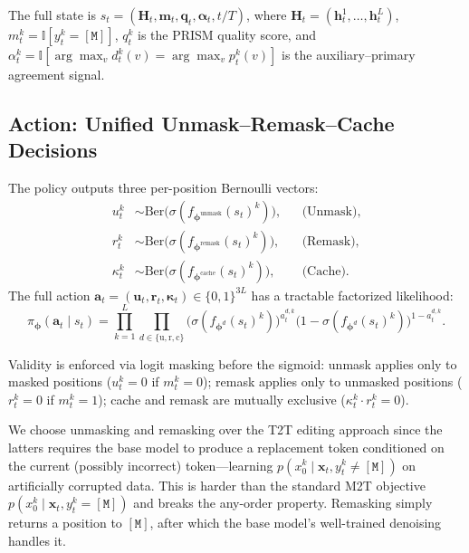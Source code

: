 \documentclass[11pt]{article}
\newcommand{\bphi}{\bm{\phi}}
\newcommand{\bx}{\mathbf{x}}
\newcommand{\bu}{\mathbf{u}}
\newcommand{\bh}{\mathbf{h}}
\newcommand{\bH}{\mathbf{H}}
\newcommand{\bfm}{\mathbf{m}}
\newcommand{\ind}{\mathbb{I}}
\newcommand{\mask}{\ensuremath{\mathtt{[M]}}}
\begin{document}
The full state is $s_t = (\bH_t, \bfm_t, \mathbf{q}_t, \bm{\alpha}_t, t/T)$, where $\bH_t = (\bh_t^1, \dots, \bh_t^L)$, $m_t^k = \ind[y_t^k = \mask]$, $q_t^k$ is the PRISM quality score, and $\alpha_t^k = \ind[\arg\max_v d_t^k(v) = \arg\max_v p_t^k(v)]$ is the auxiliary--primary agreement signal.

\subsection{Action: Unified Unmask--Remask--Cache Decisions}
\label{sec:action}

The policy outputs three per-position Bernoulli vectors:
\begin{align}
    u_t^k &\sim \text{Ber}\bigl(\sigma(f_{\bphi^{\text{unmask}}}(s_t)^k)\bigr), & &\text{(Unmask)}, \label{eq:action_u} \\
    r_t^k &\sim \text{Ber}\bigl(\sigma(f_{\bphi^{\text{remask}}}(s_t)^k)\bigr), & &\text{(Remask)}, \label{eq:action_r} \\
    \kappa_t^k &\sim \text{Ber}\bigl(\sigma(f_{\bphi^{\text{cache}}}(s_t)^k)\bigr), & &\text{(Cache)}. \label{eq:action_c}
\end{align}
The full action $\mathbf{a}_t = (\bu_t, \mathbf{r}_t, \bm{\kappa}_t) \in \{0,1\}^{3L}$ has a tractable factorized likelihood:
\begin{equation}
    \pi_{\bphi}(\mathbf{a}_t \mid s_t) = \prod_{k=1}^L \prod_{d \in \{\text{u}, \text{r}, \text{c}\}} \bigl(\sigma(f_{\bphi^d}(s_t)^k)\bigr)^{a_t^{d,k}} \bigl(1 - \sigma(f_{\bphi^d}(s_t)^k)\bigr)^{1 - a_t^{d,k}}.
    \label{eq:policy_likelihood}
\end{equation}

Validity is enforced via logit masking before the sigmoid:
unmask applies only to masked positions ($u_t^k = 0$ if $m_t^k = 0$);
remask applies only to unmasked positions ($r_t^k = 0$ if $m_t^k = 1$);
cache and remask are mutually exclusive ($\kappa_t^k \cdot r_t^k = 0$).

We choose unmasking and remasking over the T2T editing approach since the latters requires the base model to produce a replacement token conditioned on the current (possibly incorrect) token---learning $p(x_0^k \mid \bx_t, y_t^k \neq \mask)$ on artificially corrupted data.
This is harder than the standard M2T objective $p(x_0^k \mid \bx_t, y_t^k = \mask)$ and breaks the any-order property.
Remasking simply returns a position to $\mask$, after which the base model's well-trained denoising handles it.
\end{document}
